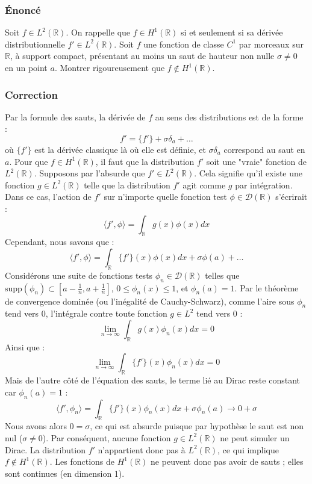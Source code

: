 \documentclass[11pt,a4paper]{article}
\begin{document}
\subsubsection*{Énoncé}
Soit $f \in L^2(\mathbb{R})$.
On rappelle que $f \in H^1(\mathbb{R})$ si et seulement si sa dérivée distributionnelle $f' \in L^2(\mathbb{R})$.
Soit $f$ une fonction de classe $C^1$ par morceaux sur $\mathbb{R}$, à support compact, présentant au moins un saut de hauteur non nulle $\sigma \neq 0$ en un point $a$.
Montrer rigoureusement que $f \notin H^1(\mathbb{R})$.

\subsubsection*{Correction}
Par la formule des sauts, la dérivée de $f$ au sens des distributions est de la forme :
$$ f' = \{f'\} + \sigma \delta_a + \dots $$
où $\{f'\}$ est la dérivée classique là où elle est définie, et $\sigma \delta_a$ correspond au saut en $a$.
Pour que $f \in H^1(\mathbb{R})$, il faut que la distribution $f'$ soit une "vraie" fonction de $L^2(\mathbb{R})$.
Supposons par l'absurde que $f' \in L^2(\mathbb{R})$. Cela signifie qu'il existe une fonction $g \in L^2(\mathbb{R})$ telle que la distribution $f'$ agit comme $g$ par intégration.
Dans ce cas, l'action de $f'$ sur n'importe quelle fonction test $\phi \in \mathcal{D}(\mathbb{R})$ s'écrirait :
$$ \langle f', \phi \rangle = \int_{\mathbb{R}} g(x)\phi(x)dx $$
Cependant, nous savons que :
$$ \langle f', \phi \rangle = \int_{\mathbb{R}} \{f'\}(x)\phi(x)dx + \sigma \phi(a) + \dots $$
Considérons une suite de fonctions tests $\phi_n \in \mathcal{D}(\mathbb{R})$ telles que $\text{supp}(\phi_n) \subset [a - \frac{1}{n}, a + \frac{1}{n}]$, $0 \le \phi_n(x) \le 1$, et $\phi_n(a) = 1$.
Par le théorème de convergence dominée (ou l'inégalité de Cauchy-Schwarz), comme l'aire sous $\phi_n$ tend vers 0, l'intégrale contre toute fonction $g \in L^2$ tend vers 0 :
$$ \lim_{n \to \infty} \int_{\mathbb{R}} g(x)\phi_n(x)dx = 0 $$
Ainsi que :
$$ \lim_{n \to \infty} \int_{\mathbb{R}} \{f'\}(x)\phi_n(x)dx = 0 $$
Mais de l'autre côté de l'équation des sauts, le terme lié au Dirac reste constant car $\phi_n(a) = 1$ :
$$ \langle f', \phi_n \rangle = \int_{\mathbb{R}} \{f'\}(x)\phi_n(x)dx + \sigma \phi_n(a) \to 0 + \sigma $$
Nous avons alors $0 = \sigma$, ce qui est absurde puisque par hypothèse le saut est non nul ($\sigma \neq 0$).
Par conséquent, aucune fonction $g \in L^2(\mathbb{R})$ ne peut simuler un Dirac. La distribution $f'$ n'appartient donc pas à $L^2(\mathbb{R})$, ce qui implique $f \notin H^1(\mathbb{R})$.
Les fonctions de $H^1(\mathbb{R})$ ne peuvent donc pas avoir de sauts ; elles sont continues (en dimension 1).
\end{document}
